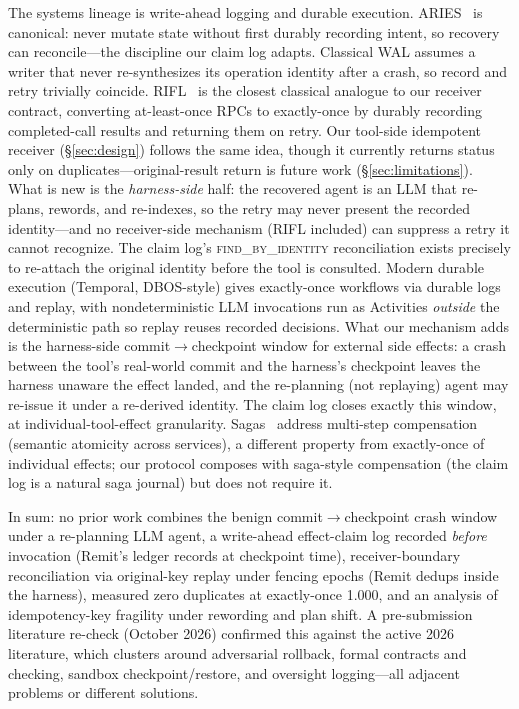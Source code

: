 \documentclass[10pt,journal,compsoc]{IEEEtran}
\begin{document}
The systems lineage is write-ahead logging and durable
execution. ARIES~\cite{aries1992} is canonical: never mutate
state without first durably recording intent, so recovery can
reconcile---the discipline our claim log adapts. Classical WAL
assumes a writer that never re-synthesizes its operation
identity after a crash, so record and retry trivially coincide.
RIFL~\cite{rifl2015} is the closest classical analogue to our
receiver contract, converting at-least-once RPCs to exactly-once
by durably recording completed-call results and returning them
on retry. Our tool-side idempotent receiver
(\S\ref{sec:design}) follows the same idea, though it currently
returns status only on duplicates---original-result return is
future work (\S\ref{sec:limitations}). What is new is the
\emph{harness-side} half: the recovered agent is an LLM that
re-plans, rewords, and re-indexes, so the retry may never
present the recorded identity---and no receiver-side mechanism
(RIFL included) can suppress a retry it cannot recognize. The
claim log's \textsc{find\_by\_identity} reconciliation exists
precisely to re-attach the original identity before the tool is
consulted. Modern durable execution (Temporal, DBOS-style)
gives exactly-once workflows via durable logs and replay, with
nondeterministic LLM invocations run as Activities \emph{outside}
the deterministic path so replay reuses recorded decisions.
What our mechanism adds is the harness-side
commit$\to$checkpoint window for external side effects: a crash
between the tool's real-world commit and the harness's
checkpoint leaves the harness unaware the effect landed, and
the re-planning (not replaying) agent may re-issue it under a
re-derived identity. The claim log closes exactly this window,
at individual-tool-effect granularity. Sagas~\cite{sagas1987}
address multi-step compensation (semantic atomicity across
services), a different property from exactly-once of individual
effects; our protocol composes with saga-style compensation
(the claim log is a natural saga journal) but does not require
it.

In sum: no prior work combines the benign commit$\to$checkpoint crash window
under a re-planning LLM agent, a write-ahead effect-claim log recorded
\emph{before} invocation (Remit's ledger records at checkpoint time),
receiver-boundary reconciliation via original-key replay under fencing epochs
(Remit dedups inside the harness), measured zero duplicates at exactly-once
1.000, and an analysis of idempotency-key fragility under rewording and plan
shift. A
pre-submission literature re-check (October 2026) confirmed this
against the active 2026 literature, which clusters around
adversarial rollback, formal contracts and checking, sandbox
checkpoint/restore, and oversight logging---all adjacent problems
or different solutions.
\end{document}
